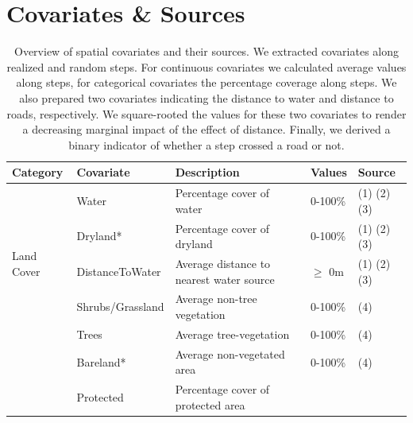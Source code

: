 \documentclass[abstract=off,10pt,a4paper,bibliography=totocnumbered]{article}
\begin{document}
\newpage
\section{Covariates \& Sources}

\begin{table}[hbtp]
  \begin{center}
    \caption{Overview of spatial covariates and their sources. We extracted
    covariates along realized and random steps. For continuous covariates we
    calculated average values along steps, for categorical covariates the
    percentage coverage along steps. We also prepared two covariates indicating
    the distance to water and distance to roads, respectively. We square-rooted
    the values for these two covariates to render a decreasing marginal impact
    of the effect of distance. Finally, we derived a binary indicator of whether
    a step crossed a road or not.}
    \label{Appendix:Sources}
    \resizebox{\textwidth}{!} {
      \begin{threeparttable}
        \begin{tabular}{lllll}
        \hline
        Category &
          Covariate &
            Description &
              Values &
                Source \\
        \midrule
        \multirow{5}{*}{Land Cover}
          & Water
            & Percentage cover of water
              & 0-100\%
                & (1) (2) (3) \\
          & Dryland*
            & Percentage cover of dryland
              & 0-100\%
                & (1) (2) (3) \\
          & DistanceToWater
            & Average distance to nearest water source
              & \(\geq\) 0m
                & (1) (2) (3) \\
          & Shrubs/Grassland
            & Average non-tree vegetation
              & 0-100\%
                & (4) \\
          & Trees
            & Average tree-vegetation
              & 0-100\%
                & (4) \\
          & Bareland*
            & Average non-vegetated area
              & 0-100\%
                & (4) \\
        \hdashline
        \multirow{2}{*}{Protection Status}
          & Protected
            & Percentage cover of protected area

\end{tabular}
\end{threeparttable}}
\end{center}
\end{table}
\end{document}
